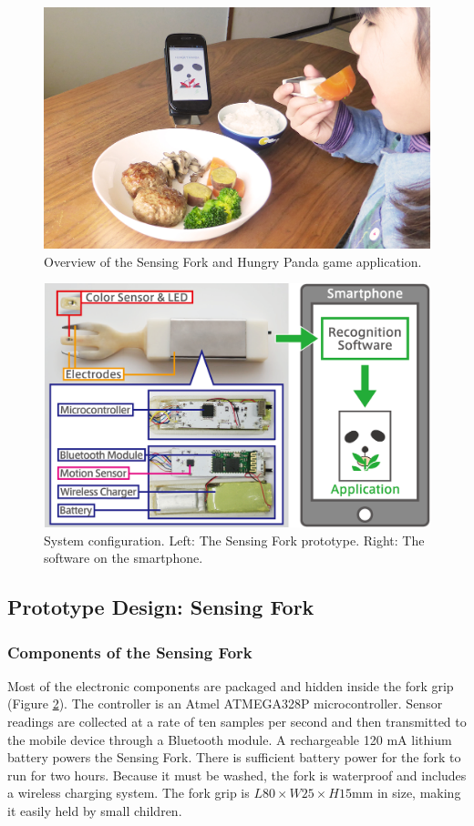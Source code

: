 \begin{figure}[t]
\begin{center}
\includegraphics[width=12cm]{image/figure01-light.jpg}
\caption{Overview of the Sensing Fork and Hungry Panda game application.}
\label{overview}
\end{center}
\end{figure}

\begin{figure}[t]
\begin{center}
\includegraphics[width=12cm]{image/systemzu02-02.png}
\caption{System configuration. Left: The Sensing Fork prototype. Right: The software on the smartphone.}
\label{system}
\end{center}
\end{figure}

\subsection{Prototype Design: Sensing Fork}
\subsubsection{Components of the Sensing Fork}
Most of the electronic components 
are packaged and hidden inside the fork grip (Figure \ref{system}). 
The controller is an Atmel ATMEGA328P microcontroller. 
Sensor readings are collected at a rate of ten samples per second and then transmitted 
to the mobile device through a Bluetooth module. 
A rechargeable 120 mA lithium battery powers the Sensing Fork. 
There is sufficient battery power for the fork to run for two hours. 
Because it must be washed, the fork is waterproof and includes a wireless charging system. 
The fork grip is $L80 \times W25 \times H15$mm in size, 
making it easily held by small children. 

